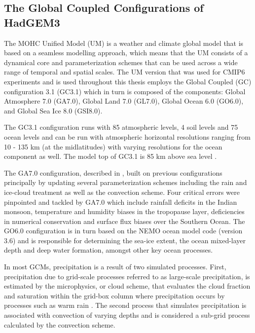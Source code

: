 \subsection{The Global Coupled Configurations of HadGEM3}

The MOHC Unified Model (UM) is a weather and climate global model that is based on a seamless modelling approach, which means that the UM consists of a dynamical core and parameterization schemes that can be used across a wide range of temporal and spatial scales. 
The UM version that was used for CMIP6 experiments and is used throughout this thesis employs the Global Coupled (GC) configuration 3.1 (GC3.1) \citep{williams2018,walters2019} which in turn is composed of the components: Global Atmosphere 7.0 (GA7.0), Global Land 7.0
(GL7.0), Global Ocean 6.0 (GO6.0), and Global Sea Ice 8.0 (GSI8.0).

The GC3.1 configuration runs with 85 atmospheric levels, 4 soil levels and 75 ocean levels and can be run with atmospheric horizontal resolutions ranging from 10 - 135 km (at the midlatitudes) with varying resolutions for the ocean component as well. The model top of GC3.1 is 85 km above sea level \citep{walters2019}. 

The GA7.0 configuration, described in \cite{walters2019}, built on previous configurations principally by updating several parameterization schemes including the rain and ice-cloud treatment as well as the convection scheme. Four critical errors were pinpointed and tackled by GA7.0 which include rainfall deficits in the Indian monsoon, temperature and humidity biases in the tropopause layer, deficiencies in numerical conservation and surface flux biases over the Southern Ocean. The GO6.0 configuration \citep{storkey2018} is in turn based on the NEMO ocean model code (version 3.6) and is responsible for determining the sea-ice extent, the ocean mixed-layer depth and deep water formation, amongst other key ocean processes.


In most GCMs, precipitation is a result of two simulated processes. First, precipitation due to grid-scale processes referred to as large-scale precipitation, is estimated by the microphysics, or cloud scheme, that evaluates the cloud fraction and saturation within the grid-box column where precipitation occurs by processes such as warm rain \citep{walters2019}. 
The second process that simulates precipitation is associated with convection of varying depths and is considered a sub-grid process calculated by the convection scheme. 

